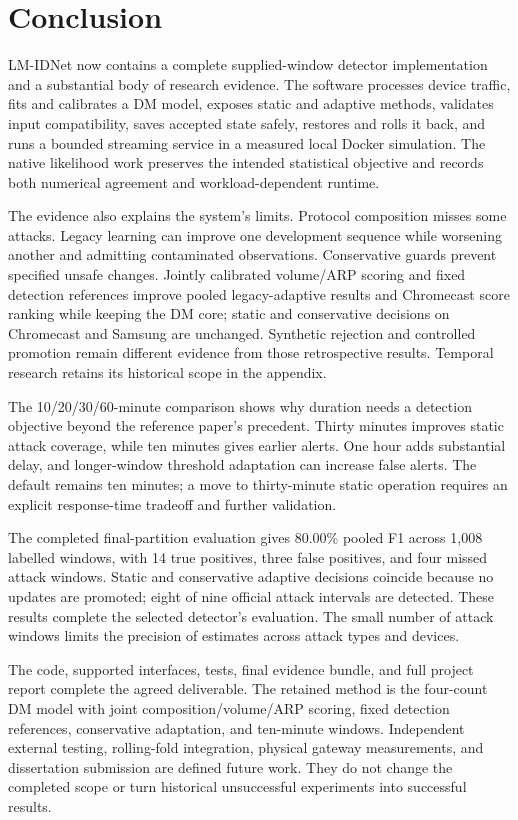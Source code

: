 \section{Conclusion}

LM-IDNet now contains a complete supplied-window detector implementation and a
substantial body of research evidence. The software processes device traffic,
fits and calibrates a DM model, exposes static and adaptive methods, validates
input compatibility, saves accepted state safely, restores and rolls it back,
and runs a bounded streaming service in a measured local Docker simulation.
The native likelihood work preserves the intended statistical objective and
records both numerical agreement and workload-dependent runtime.

The evidence also explains the system's limits. Protocol composition misses
some attacks. Legacy learning can improve one development sequence while
worsening another and admitting contaminated observations. Conservative guards
prevent specified unsafe changes. Jointly calibrated volume/ARP scoring and
fixed detection references improve pooled legacy-adaptive results and Chromecast
score ranking while keeping the DM core; static and conservative decisions on
Chromecast and Samsung are unchanged.
Synthetic rejection and controlled promotion remain different evidence from
those retrospective results. Temporal research retains its historical scope in the appendix.

The 10/20/30/60-minute comparison shows why duration needs a detection objective
beyond the reference paper's precedent. Thirty minutes improves static attack
coverage, while ten minutes gives earlier alerts. One hour adds substantial
delay, and longer-window threshold adaptation can increase false alerts.
The default remains ten minutes; a move to thirty-minute static operation
requires an explicit response-time tradeoff and further validation.

The completed final-partition evaluation gives 80.00\% pooled F1 across 1,008
labelled windows, with 14 true positives, three false positives, and four missed
attack windows. Static and conservative adaptive decisions coincide because no
updates are promoted; eight of nine official attack intervals are detected.
These results complete the selected detector’s evaluation. The small number
of attack windows limits the precision of estimates across attack types
and devices.

The code, supported interfaces, tests, final evidence bundle, and full project
report complete the agreed deliverable. The retained method is the four-count
DM model with joint composition/volume/ARP scoring, fixed detection references,
conservative adaptation, and ten-minute windows. Independent external testing,
rolling-fold integration, physical gateway measurements, and dissertation
submission are defined future work. They do not change the completed scope or
turn historical unsuccessful experiments into successful results.

